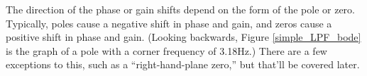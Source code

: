 The direction of the phase or gain shifts depend on the form of the pole or zero. Typically, poles cause a negative shift in phase and gain, and zeros cause a positive shift in phase and gain. (Looking backwards, Figure \ref{simple_LPF_bode} is the graph of a pole with a corner frequency of 3.18Hz.) There are a few exceptions to this, such as a ``right-hand-plane zero,'' but that'll be covered later.